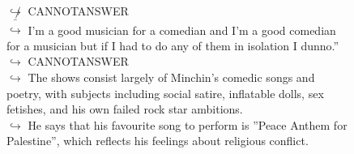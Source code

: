 \documentclass[11pt,a4paper, onecolumn]{article}
\begin{document}
\begin{figure}[t] \small \begin{tcolorbox}[boxsep=0pt,left=5pt,right=0pt,top=2pt,colback = yellow!5] \begin{dialogue}
 \small 
\colorbox{pink!25}{$\not\hookrightarrow$}
{ CANNOTANSWER }
\\
\colorbox{pink!25}{ $\bar{\hookrightarrow}$}
{ I'm a good musician for a comedian and I'm a good comedian for a musician but if I had to do any of them in isolation I dunno.'' }
\\
\colorbox{pink!25}{$\hookrightarrow$}
{ CANNOTANSWER }
\\
\colorbox{pink!25}{$\hookrightarrow$}
{ The shows consist largely of Minchin's comedic songs and poetry, with subjects including social satire, inflatable dolls, sex fetishes, and his own failed rock star ambitions. }
\\
\colorbox{pink!25}{$\hookrightarrow$}
{ He says that his favourite song to perform is ''Peace Anthem for Palestine'', which reflects his feelings about religious conflict. }
\\
 \end{dialogue}\end{tcolorbox}\end{figure}
\end{document}
